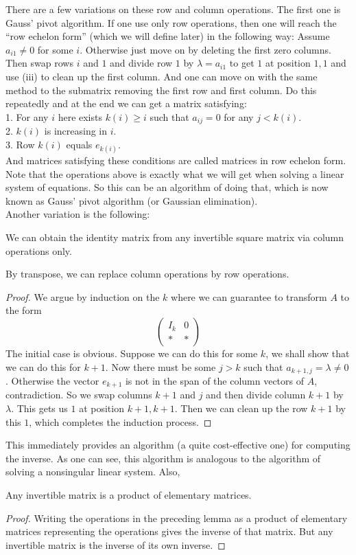 There are a few variations on these row and column operations.
The first one is Gauss' pivot algorithm.
If one use only row operations, then one will reach the ``row echelon form'' (which we will define later) in the following way:
Assume $a_{i1}\neq 0$ for some $i$.
Otherwise just move on by deleting the first zero columns.
Then swap rows $i$ and $1$ and divide row $1$ by $\lambda=a_{i1}$ to get $1$ at position $1,1$ and use (iii) to clean up the first column.
And one can move on with the same method to the submatrix removing the first row and first column.
Do this repeatedly and at the end we can get a matrix satisfying:\\
1. For any $i$ here exists $k(i)\ge i$ such that $a_{ij}=0$ for any $j<k(i)$.\\
2. $k(i)$ is increasing in $i$.\\
3. Row $k(i)$ equals $e_{k(i)}$.\\
And matrices satisfying these conditions are called matrices in row echelon form.
Note that the operations above is exactly what we will get when solving a linear system of equations.
So this can be an algorithm of doing that, which is now known as Gauss' pivot algorithm (or Gaussian elimination).\\
Another variation is the following:
\begin{lemma}
    We can obtain the identity matrix from any invertible square matrix via column operations only.
\end{lemma}
By transpose, we can replace column operations by row operations.
\begin{proof}
    We argue by induction on the $k$ where we can guarantee to transform $A$ to the form
    $$\begin{pmatrix}
        I_k&0\\
        \ast&\ast
    \end{pmatrix}$$
    The initial case is obvious.
    Suppose we can do this for some $k$, we shall show that we can do this for $k+1$.
    Now there must be some $j>k$ such that $a_{k+1,j}=\lambda\neq0$.
    Otherwise the vector $e_{k+1}$ is not in the span of the column vectors of $A$, contradiction.
    So we swap columns $k+1$ and $j$ and then divide column $k+1$ by $\lambda$.
    This gets us $1$ at position $k+1,k+1$.
    Then we can clean up the row $k+1$ by this $1$, which completes the induction process.
\end{proof}
This immediately provides an algorithm (a quite cost-effective one) for computing the inverse.
As one can see, this algorithm is analogous to the algorithm of solving a nonsingular linear system.
Also,
\begin{proposition}
    Any invertible matrix is a product of elementary matrices.
\end{proposition}
\begin{proof}
    Writing the operations in the preceding lemma as a product of elementary matrices representing the operations gives the inverse of that matrix.
    But any invertible matrix is the inverse of its own inverse.
\end{proof}